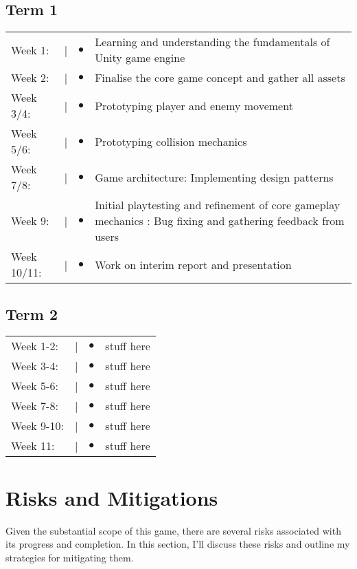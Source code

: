 \documentclass[12pt]{article}
\begin{document}
\subsection{Term 1}
\begin{tabular}{@{}p{2cm}@{}>{\raggedright\arraybackslash}p{0.5cm}@{}>{\raggedright\arraybackslash}p{0.5cm}@{}p{12cm}}
Week 1: & \textcolor{black}{|} & $\bullet$ & Learning and understanding the fundamentals of Unity game engine \\
Week 2: & \textcolor{black}{|} & $\bullet$ & Finalise the core game concept and gather all assets \\
Week 3/4: & \textcolor{black}{|} & $\bullet$ & Prototyping player and enemy movement \\
Week 5/6: & \textcolor{black}{|} & $\bullet$ &  Prototyping collision mechanics \\
Week 7/8: & \textcolor{black}{|} & $\bullet$ & Game architecture: Implementing design patterns \\
Week 9: & \textcolor{black}{|} & $\bullet$ & Initial playtesting and refinement of core gameplay mechanics : Bug fixing and gathering feedback from users\\
Week 10/11: & \textcolor{black}{|} & $\bullet$ & Work on interim report and presentation \\
\end{tabular}

\subsection{Term 2}
\begin{tabular}{@{}p{2cm}@{}>{\raggedright\arraybackslash}p{0.5cm}@{}>{\raggedright\arraybackslash}p{0.5cm}@{}p{12cm}}
Week 1-2: & \textcolor{black}{|} & $\bullet$ & stuff here \\
Week 3-4: & \textcolor{black}{|} & $\bullet$ & stuff here \\
Week 5-6: & \textcolor{black}{|} & $\bullet$ & stuff here \\
Week 7-8: & \textcolor{black}{|} & $\bullet$ & stuff here \\
Week 9-10: & \textcolor{black}{|} & $\bullet$ & stuff here \\
Week 11: & \textcolor{black}{|} & $\bullet$ & stuff here \\
\end{tabular}


\section{Risks and Mitigations}
Given the substantial scope of this game, there are several risks associated with its progress and completion. In this section, I'll discuss these risks and outline my strategies for mitigating them.
\end{document}
